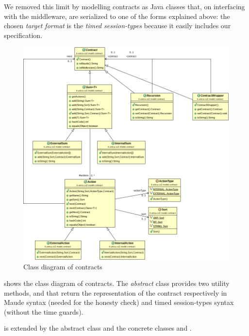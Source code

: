 We removed this limit by modelling contracts as Java classes that, on interfacing with the middleware, are serialized to one of the forms explained above: the chosen \textit{target format} is  the \textit{timed session-types} because it easily includes our specification.

\begin{figure}
	\centering
	\includegraphics[scale=0.4]{img/class-diag/contracts.png}
	\caption{Class diagram of contracts}
	\label{fig:class-diag-contracts}
\end{figure}

 shows the class diagram of contracts. The \textit{abstract} class  provides two utility methods,  and  that return the  representation of the contract respectively in Maude syntax (needed for the honesty check) and timed session-types syntax (without the time guards).

 is extended by the abstract class  and the concrete classes  and . 

